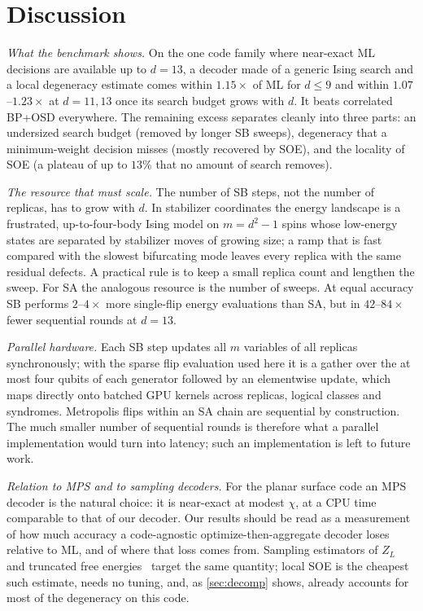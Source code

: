 \documentclass[journal]{IEEEtran}
\begin{document}
\section{Discussion}
\label{sec:discussion}

\emph{What the benchmark shows.} On the one code family where near-exact ML decisions are available up to $d=13$, a decoder made of a generic Ising search and a local degeneracy estimate comes within $1.15\times$ of ML for $d\le9$ and within $1.07$--$1.23\times$ at $d=11,13$ once its search budget grows with $d$. It beats correlated BP+OSD everywhere. The remaining excess separates cleanly into three parts: an undersized search budget (removed by longer SB sweeps), degeneracy that a minimum-weight decision misses (mostly recovered by SOE), and the locality of SOE (a plateau of up to $13\%$ that no amount of search removes).

\emph{The resource that must scale.} The number of SB steps, not the number of replicas, has to grow with $d$. In stabilizer coordinates the energy landscape is a frustrated, up-to-four-body Ising model on $m=d^2-1$ spins whose low-energy states are separated by stabilizer moves of growing size; a ramp that is fast compared with the slowest bifurcating mode leaves every replica with the same residual defects. A practical rule is to keep a small replica count and lengthen the sweep. For SA the analogous resource is the number of sweeps. At equal accuracy SB performs $2$--$4\times$ more single-flip energy evaluations than SA, but in $42$--$84\times$ fewer sequential rounds at $d=13$.

\emph{Parallel hardware.} Each SB step updates all $m$ variables of all replicas synchronously; with the sparse flip evaluation used here it is a gather over the at most four qubits of each generator followed by an elementwise update, which maps directly onto batched GPU kernels across replicas, logical classes and syndromes. Metropolis flips within an SA chain are sequential by construction. The much smaller number of sequential rounds is therefore what a parallel implementation would turn into latency; such an implementation is left to future work.

\emph{Relation to MPS and to sampling decoders.} For the planar surface code an MPS decoder is the natural choice: it is near-exact at modest $\chi$, at a CPU time comparable to that of our decoder. Our results should be read as a measurement of how much accuracy a code-agnostic optimize-then-aggregate decoder loses relative to ML, and of where that loss comes from. Sampling estimators of $Z_L$~\cite{hutter2014,martinezgarcia2024,tobias2026,krishnamoorthy2026} and truncated free energies~\cite{liu2026amld} target the same quantity; local SOE is the cheapest such estimate, needs no tuning, and, as \cref{sec:decomp} shows, already accounts for most of the degeneracy on this code.
\end{document}
